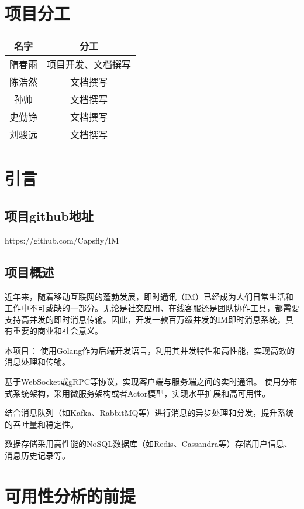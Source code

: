 \documentclass[12pt]{article}
\begin{document}
	\tableofcontents
	\newpage
	\section{项目分工}
	\begin{tabular}{|c|c|}%
		\hline  %
		名字&分工\\
		\hline  %
		隋春雨&项目开发、文档撰写\\
		\hline %
		陈浩然&文档撰写\\
		\hline %
		孙帅&文档撰写\\
		\hline %
		史勤铮&文档撰写\\
		\hline %
		刘骏远&文档撰写\\
		\hline %
	\end{tabular}
	

	\section{引言}
	\subsection{项目github地址}
	https://github.com/Capsfly/IM
	\subsection{项目概述}
	近年来，随着移动互联网的蓬勃发展，即时通讯（IM）已经成为人们日常生活和工作中不可或缺的一部分。无论是社交应用、在线客服还是团队协作工具，都需要支持高并发的即时消息传输。因此，开发一款百万级并发的IM即时消息系统，具有重要的商业和社会意义。
	
	本项目：
	使用Golang作为后端开发语言，利用其并发特性和高性能，实现高效的消息处理和传输。
	
	基于WebSocket或gRPC等协议，实现客户端与服务端之间的实时通讯。
	使用分布式系统架构，采用微服务架构或者Actor模型，实现水平扩展和高可用性。
	
	结合消息队列（如Kafka、RabbitMQ等）进行消息的异步处理和分发，提升系统的吞吐量和稳定性。
	
	数据存储采用高性能的NoSQL数据库（如Redis、Cassandra等）存储用户信息、消息历史记录等。
	
	\section{可用性分析的前提}
\end{document}
